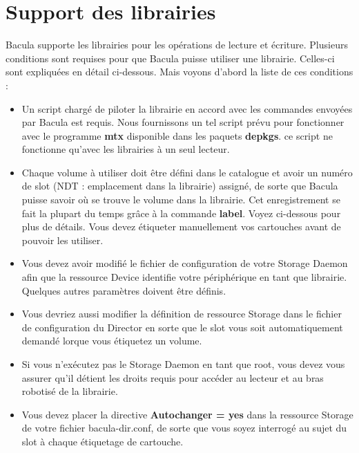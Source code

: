 
\chapter{Support des librairies}
\label{AutochangersChapter}

Bacula supporte les librairies pour les op\'erations de lecture et \'ecriture. 
Plusieurs conditions sont requises pour que Bacula puisse utiliser une librairie. 
Celles-ci sont expliqu\'ees en d\'etail ci-dessous.
Mais voyons d'abord la liste de ces conditions :

\begin{itemize}
\item Un script charg\'e de piloter la librairie en accord avec les commandes 
   envoy\'ees par Bacula est requis. Nous fournissons un tel script pr\'evu pour fonctionner 
   avec le programme {\bf mtx} disponible dans les paquets {\bf depkgs}. ce script ne 
   fonctionne qu'avec les librairies \`a un seul lecteur.
\item Chaque volume \`a utiliser doit \^etre d\'efini dans le catalogue et avoir 
  un num\'ero de slot (NDT : emplacement dans la librairie) assign\'e, de sorte 
  que Bacula puisse savoir o\`u se trouve le volume dans la librairie. Cet 
  enregistrement se fait la plupart du temps gr\^ace \`a la commande {\bf label}. 
  Voyez ci-dessous pour plus de d\'etails. Vous devez \'etiqueter manuellement 
  vos cartouches avant de pouvoir les utiliser.
\item Vous devez avoir modifi\'e le fichier de configuration de votre Storage 
  Daemon afin que la ressource Device identifie votre p\'eriph\'erique en tant 
  que librairie. Quelques autres param\`etres doivent \^etre d\'efinis.
\item Vous devriez aussi modifier la d\'efinition de ressource Storage dans le 
fichier de configuration du Director en sorte que le slot vous soit automatiquement 
demand\'e lorque vous \'etiquetez un volume.
\item Si vous n'ex\'ecutez pas le Storage Daemon en tant que root, vous devez 
  vous assurer qu'il d\'etient les droits requis pour acc\'eder au lecteur et au 
  bras robotis\'e de la librairie.
\item Vous devez placer la directive {\bf Autochanger = yes} dans la 
  ressource Storage de votre fichier bacula-dir.conf, de sorte que vous soyez 
  interrog\'e au sujet du slot \`a chaque \'etiquetage de cartouche.
\end{itemize}

